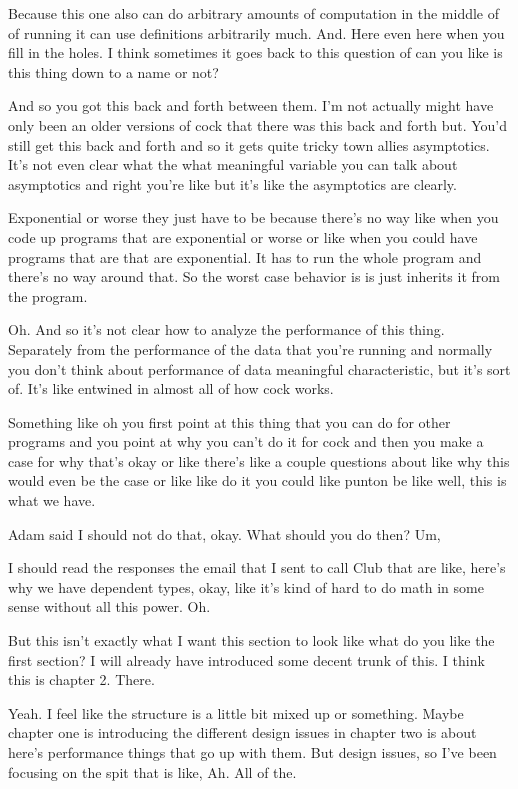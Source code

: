 \begin{subappendices}
    Because this one also can do arbitrary amounts of computation in the middle of of running it can use definitions arbitrarily much. And. Here even here when you fill in the holes. I think sometimes it goes back to this question of can you like is this thing down to a name or not? 
    
    And so you got this back and forth between them. I'm not actually might have only been an older versions of cock that there was this back and forth but. You'd still get this back and forth and so it gets quite tricky town allies asymptotics. It's not even clear what the what meaningful variable you can talk about asymptotics and right you're like but it's like the asymptotics are clearly. 
    
    Exponential or worse they just have to be because there's no way like when you code up programs that are exponential or worse or like when you could have programs that are that are exponential. It has to run the whole program and there's no way around that. So the worst case behavior is is just inherits it from the program. 
    
    Oh. And so it's not clear how to analyze the performance of this thing. Separately from the performance of the data that you're running and normally you don't think about performance of data meaningful characteristic, but it's sort of. It's like entwined in almost all of how cock works. 
    
    Something like oh you first point at this thing that you can do for other programs and you point at why you can't do it for cock and then you make a case for why that's okay or like there's like a couple questions about like why this would even be the case or like like do it you could like punton be like well, this is what we have. 
    
    Adam said I should not do that, okay. What should you do then? Um, 
    
    I should read the responses the email that I sent to call Club that are like, here's why we have dependent types, okay, like it's kind of hard to do math in some sense without all this power. Oh. 
    
    But this isn't exactly what I want this section to look like what do you like the first section? I will already have introduced some decent trunk of this. I think this is chapter 2. There. 
    
    Yeah. I feel like the structure is a little bit mixed up or something. Maybe chapter one is introducing the different design issues in chapter two is about here's performance things that go up with them. But design issues, so I've been focusing on the spit that is like, Ah. All of the. 
    

\end{subappendices}
